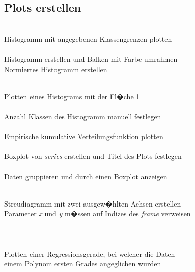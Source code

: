 \documentclass{article}
\begin{document}
\begin{multicols*}{3}
\subsection*{Plots erstellen}
 \\
Histogramm mit angegebenen Klassengrenzen plotten \\

 \\
Histogramm erstellen und Balken mit Farbe umrahmen \\

Normiertes Histogramm erstellen

 \\
Plotten eines Histograms mit der Fl�che 1 \\

 \\
Anzahl Klassen des Histogramm manuell festlegen \\

 \\
Empirische kumulative Verteilungsfunktion plotten \\

 \\
Boxplot von \textit{series} erstellen und Titel des Plots festlegen \\

 \\
Daten gruppieren und durch einen Boxplot anzeigen

 \\
Streudiagramm mit zwei ausgew�hlten Achsen erstellen \\
Parameter \textit{x} und \textit{y} m�ssen auf Indizes des \textit{frame} verweisen \\

 \\
 \\
 \\
Plotten einer Regressionsgerade, bei welcher die Daten \\
einem Polynom ersten Grades angeglichen wurden \\


\end{multicols*}
\end{document}

